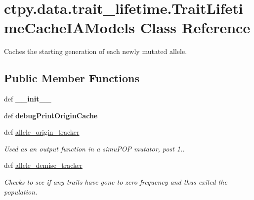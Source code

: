 \hypertarget{classctpy_1_1data_1_1trait__lifetime_1_1_trait_lifetime_cache_i_a_models}{\section{ctpy.\-data.\-trait\-\_\-lifetime.\-Trait\-Lifetime\-Cache\-I\-A\-Models Class Reference}
\label{classctpy_1_1data_1_1trait__lifetime_1_1_trait_lifetime_cache_i_a_models}
}


Caches the starting generation of each newly mutated allele.  


\subsection*{Public Member Functions}
\begin{DoxyCompactItemize}
\item 
\hypertarget{classctpy_1_1data_1_1trait__lifetime_1_1_trait_lifetime_cache_i_a_models_aa8f37e27c5e6c87657232372b748c6ba}{def {\bfseries \-\_\-\-\_\-init\-\_\-\-\_\-}}\label{classctpy_1_1data_1_1trait__lifetime_1_1_trait_lifetime_cache_i_a_models_aa8f37e27c5e6c87657232372b748c6ba}

\item 
\hypertarget{classctpy_1_1data_1_1trait__lifetime_1_1_trait_lifetime_cache_i_a_models_ae8808c305c0c7bd0c9a95aa5bcc15d29}{def {\bfseries debug\-Print\-Origin\-Cache}}\label{classctpy_1_1data_1_1trait__lifetime_1_1_trait_lifetime_cache_i_a_models_ae8808c305c0c7bd0c9a95aa5bcc15d29}

\item 
\hypertarget{classctpy_1_1data_1_1trait__lifetime_1_1_trait_lifetime_cache_i_a_models_a79dd58583fc674ec882f7e8119c563b0}{def \hyperlink{classctpy_1_1data_1_1trait__lifetime_1_1_trait_lifetime_cache_i_a_models_a79dd58583fc674ec882f7e8119c563b0}{allele\-\_\-origin\-\_\-tracker}}\label{classctpy_1_1data_1_1trait__lifetime_1_1_trait_lifetime_cache_i_a_models_a79dd58583fc674ec882f7e8119c563b0}

\begin{DoxyCompactList}\small\item\em Used as an output function in a simu\-P\-O\-P mutator, post 1.. \end{DoxyCompactList}\item 
def \hyperlink{classctpy_1_1data_1_1trait__lifetime_1_1_trait_lifetime_cache_i_a_models_ab75d75f7c965b390dadc6a210cc860eb}{allele\-\_\-demise\-\_\-tracker}
\begin{DoxyCompactList}\small\item\em Checks to see if any traits have gone to zero frequency and thus exited the population. \end{DoxyCompactList}\end{DoxyCompactItemize}
